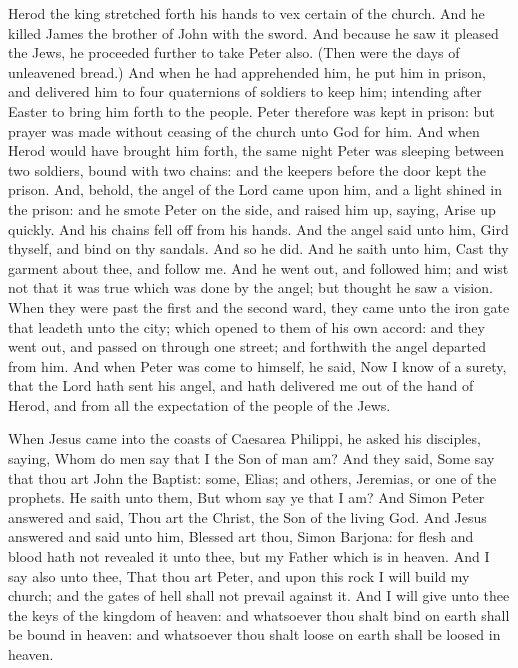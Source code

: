  Herod the king stretched forth his hands to vex certain of the church. And he killed James the brother of John with the sword. And because he saw it pleased the Jews, he proceeded further to take Peter also. (Then were the days of unleavened bread.) And when he had apprehended him, he put him in prison, and delivered him to four quaternions of soldiers to keep him; intending after Easter to bring him forth to the people. Peter therefore was kept in prison: but prayer was made without ceasing of the church unto God for him. And when Herod would have brought him forth, the same night Peter was sleeping between two soldiers, bound with two chains: and the keepers before the door kept the prison. And, behold, the angel of the Lord came upon him, and a light shined in the prison: and he smote Peter on the side, and raised him up, saying, Arise up quickly. And his chains fell off from his hands. And the angel said unto him, Gird thyself, and bind on thy sandals. And so he did. And he saith unto him, Cast thy garment about thee, and follow me. And he went out, and followed him; and wist not that it was true which was done by the angel; but thought he saw a vision. When they were past the first and the second ward, they came unto the iron gate that leadeth unto the city; which opened to them of his own accord: and they went out, and passed on through one street; and forthwith the angel departed from him. And when Peter was come to himself, he said, Now I know of a surety, that the Lord hath sent his angel, and hath delivered me out of the hand of Herod, and from all the expectation of the people of the Jews.


 When Jesus came into the coasts of Caesarea Philippi, he asked his disciples, saying, Whom do men say that I the Son of man am? And they said, Some say that thou art John the Baptist: some, Elias; and others, Jeremias, or one of the prophets. He saith unto them, But whom say ye that I am? And Simon Peter answered and said, Thou art the Christ, the Son of the living God. And Jesus answered and said unto him, Blessed art thou, Simon Barjona: for flesh and blood hath not revealed it unto thee, but my Father which is in heaven. And I say also unto thee, That thou art Peter, and upon this rock I will build my church; and the gates of hell shall not prevail against it. And I will give unto thee the keys of the kingdom of heaven: and whatsoever thou shalt bind on earth shall be bound in heaven: and whatsoever thou shalt loose on earth shall be loosed in heaven.

